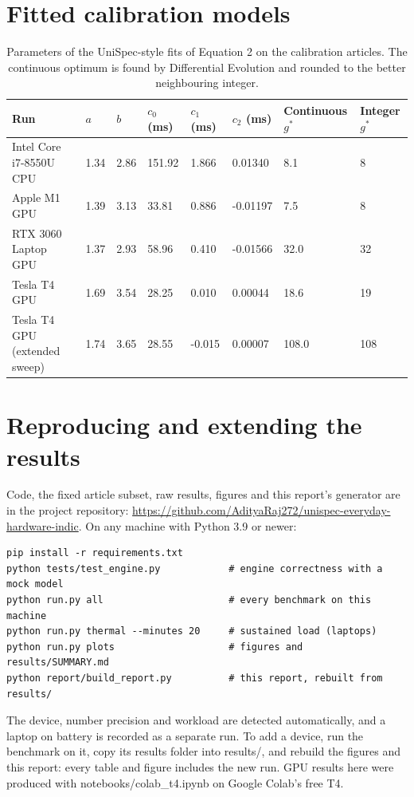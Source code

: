 \documentclass[11pt,a4paper]{article}
\begin{document}
\section{Fitted calibration models}
\begin{table}[H]
\centering
\small
\caption{Parameters of the UniSpec-style fits of Equation 2 on the calibration articles. The continuous optimum is found by Differential Evolution and rounded to the better neighbouring integer.}
\setlength{\tabcolsep}{4pt}
\begin{tabular}{L{3.29cm}L{1.10cm}L{1.10cm}L{1.46cm}L{1.46cm}L{1.73cm}L{2.01cm}L{1.73cm}}
\toprule
\textbf{Run} & \textbf{$a$} & \textbf{$b$} & \textbf{$c_0$ (ms)} & \textbf{$c_1$ (ms)} & \textbf{$c_2$ (ms)} & \textbf{Continuous $g^*$} & \textbf{Integer $g^*$} \\
\midrule
Intel Core i7-8550U CPU & 1.34 & 2.86 & 151.92 & 1.866 & 0.01340 & 8.1 & 8 \\
Apple M1 GPU & 1.39 & 3.13 & 33.81 & 0.886 & -0.01197 & 7.5 & 8 \\
RTX 3060 Laptop GPU & 1.37 & 2.93 & 58.96 & 0.410 & -0.01566 & 32.0 & 32 \\
Tesla T4 GPU & 1.69 & 3.54 & 28.25 & 0.010 & 0.00044 & 18.6 & 19 \\
Tesla T4 GPU (extended sweep) & 1.74 & 3.65 & 28.55 & -0.015 & 0.00007 & 108.0 & 108 \\
\bottomrule
\end{tabular}
\end{table}
\section{Reproducing and extending the results}
Code, the fixed article subset, raw results, figures and this report's generator are in the project repository: \url{https://github.com/AdityaRaj272/unispec-everyday-hardware-indic}. On any machine with Python 3.9 or newer:

\begin{lstlisting}
pip install -r requirements.txt
python tests/test_engine.py            # engine correctness with a mock model
python run.py all                      # every benchmark on this machine
python run.py thermal --minutes 20     # sustained load (laptops)
python run.py plots                    # figures and results/SUMMARY.md
python report/build_report.py          # this report, rebuilt from results/
\end{lstlisting}
The device, number precision and workload are detected automatically, and a laptop on battery is recorded as a separate run. To add a device, run the benchmark on it, copy its results folder into results/, and rebuild the figures and this report: every table and figure includes the new run. GPU results here were produced with notebooks/colab\_t4.ipynb on Google Colab's free T4.
\end{document}
